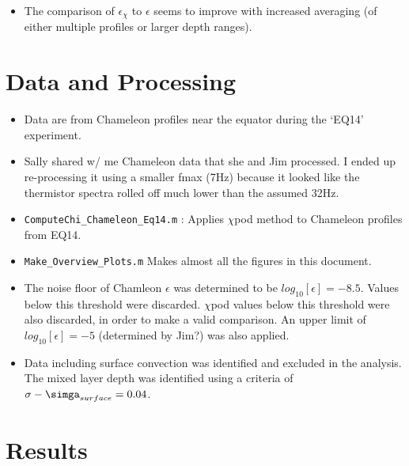 \documentclass[11pt]{article}
\begin{document}
\begin{itemize}
\item The comparison of $\epsilon_{\chi}$ to $\epsilon$ seems to improve with increased averaging (of either multiple profiles or larger depth ranges). 

\end{itemize}




\clearpage
\section{Data and Processing}

\begin{itemize}

\item Data are from Chameleon profiles near the equator during the `EQ14' experiment.

\item Sally shared w/ me Chameleon data that she and Jim processed. I ended up re-processing it using a smaller fmax (7Hz) because it looked like the thermistor spectra rolled off much lower than the assumed 32Hz.

\item \verb+ComputeChi_Chameleon_Eq14.m+ : Applies $\chi$pod method to Chameleon profiles from EQ14.

\item \verb+Make_Overview_Plots.m+ Makes almost all the figures in this document.

\item The noise floor of Chamleon $\epsilon$ was determined to be $log_{10}[\epsilon]=-8.5$. Values below this threshold were discarded. $\chi$pod values below this threshold were also discarded, in order to make a valid comparison. An upper limit of $log_{10}[\epsilon]=-5$ (determined by Jim?) was also applied.

\item Data including surface convection was identified and excluded in the analysis. The mixed layer depth was identified using a criteria of $\sigma -\simga_{surface}=0.04$.

\end{itemize}




\clearpage
\section{Results}
\end{document}
